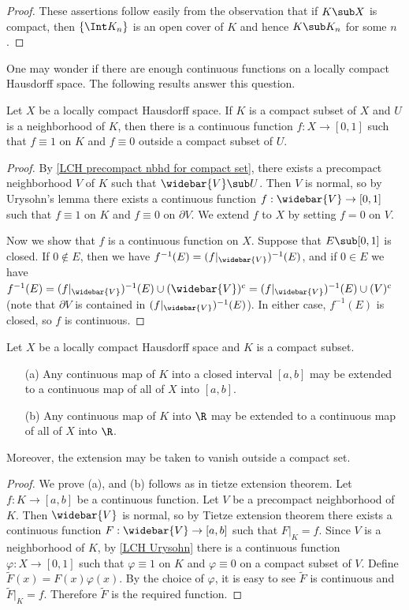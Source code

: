 \begin{proof}
These assertions follow easily from the observation that if $K\sub X$ is compact, then $\{\Int K_n\}$ is an open cover of $K$ and hence $K\sub K_n$ for some $n$.
\end{proof}
One may wonder if there are enough continuous functions on a locally compact Hausdorff space. The following results answer this question.
\begin{proposition}\label{LCH Urysohn}
Let $X$ be a locally compact Hausdorff space. If $K$ is a compact subset of $X$ and $U$ is a neighborhood of $K$, then there is a continuous function $f:X\to[0,1]$ such that $f\equiv 1$ on $K$ and $f\equiv 0$ outside a compact subset of $U$.
\end{proposition}
\begin{proof}
By \cref{LCH precompact nbhd for compact set}, there exists a precompact neighborhood $V$ of $K$ such that $\widebar{V}\sub U$. Then $V$ is normal, so by Urysohn's lemma there exists a continuous function $f:\widebar{V}\to[0,1]$ such that $f\equiv 1$ on $K$ and $f\equiv 0$ on $\partial V$. We extend $f$ to $X$ by setting $f=0$ on $V$.\par
Now we show that $f$ is a continuous function on $X$. Suppose that $E\sub[0,1]$ is closed. If $0\notin E$, then we have $f^{-1}(E)=(f|_{\widebar{V}})^{-1}(E)$, and if $0\in E$ we have $f^{-1}(E)=(f|_{\widebar{V}})^{-1}(E)\cup(\widebar{V})^c=(f|_{\widebar{V}})^{-1}(E)\cup(V)^c$ (note that $\partial V$ is contained in $(f|_{\widebar{V}})^{-1}(E)$). In either case, $f^{-1}(E)$ is closed, so $f$ is continuous. 
\end{proof}
\begin{proposition}\label{LCH Tietze Extension}
Let $X$ be a locally compact Hausdorff space and $K$ is a compact subset.
\begin{itemize}
\item[(a)] Any continuous map of $K$ into a closed interval $[a,b]$ may be extended to a continuous map of all of $X$ into $[a,b]$.
\item[(b)] Any continuous map of $K$ into $\R$ may be extended to a continuous map of all of $X$ into $\R$.
\end{itemize}
Moreover, the extension may be taken to vanish outside a compact set.
\end{proposition}
\begin{proof}
We prove (a), and (b) follows as in tietze extension theorem. Let $f:K\to[a,b]$ be a continuous function. Let $V$ be a precompact neighborhood of $K$. Then $\widebar{V}$ is normal, so by Tietze extension theorem there exists a continuous function $F:\widebar{V}\to[a,b]$ such that $F|_K=f$. Since $V$ is a neighborhood of $K$, by \ref{LCH Urysohn} there is a continuous function $\varphi:X\to[0,1]$ such that $\varphi\equiv 1$ on $K$ and $\varphi\equiv 0$ on a compact subset of $V$. Define $\widetilde{F}(x)=F(x)\varphi(x)$. By the choice of $\varphi$, it is easy to see $\widetilde{F}$ is continuous and $\widetilde{F}|_K=f$. Therefore $\widetilde{F}$ is the required function.
\end{proof}
